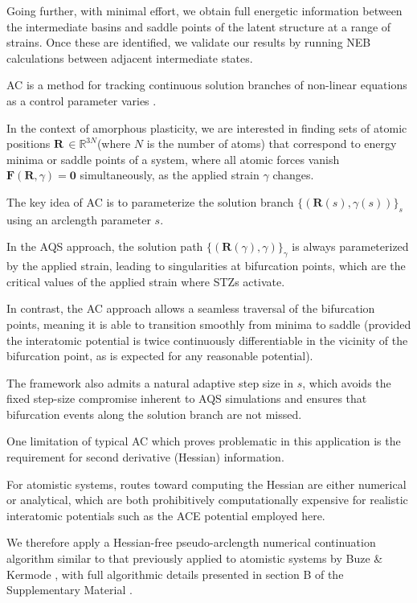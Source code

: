 \documentclass[aps,prl,reprint,superscriptaddress]{revtex4-2}
\begin{document}
Going further, with minimal effort, we obtain full energetic information between the intermediate basins and saddle points of the latent structure at a range of strains. Once these are identified, we validate our results by running NEB calculations between adjacent intermediate states.

AC is a method for tracking continuous solution branches of non-linear equations as a control parameter varies \cite{allgower2003introduction}.

In the context of amorphous plasticity, we are interested in finding sets of atomic positions $\mathbf{R}\, \in \mathbb{R}^{3N}$(where $N$ is the number of atoms) that correspond to energy minima or saddle points of a system, where all atomic forces vanish $\mathbf{F}(\mathbf{R},\gamma)=\mathbf{0}$ simultaneously, as the applied strain $\gamma$ changes.

The key idea of AC is to parameterize the solution branch $\{(\mathbf{R}(s), \gamma(s))\}_s$ using an arclength parameter $s$.

In the AQS approach, the solution path $\{(\mathbf{R}(\gamma),\gamma)\}_{\gamma}$ is always parameterized by the applied strain, leading to singularities at bifurcation points, which are the critical values of the applied strain where STZs activate.

In contrast, the AC approach allows a seamless traversal of the bifurcation points, meaning it is able to transition smoothly from minima to saddle (provided the interatomic potential is twice continuously differentiable in the vicinity of the bifurcation point, as is expected for any reasonable potential).

The framework also admits a natural adaptive step size in $s$, which avoids the fixed step-size compromise inherent to AQS simulations and ensures that bifurcation events along the solution branch are not missed.

One limitation of typical AC which proves problematic in this application is the requirement for second derivative (Hessian) information.

For atomistic systems, routes toward computing the Hessian are either numerical or analytical, which are both prohibitively computationally expensive for realistic interatomic potentials such as the ACE potential employed here.

We therefore apply a Hessian-free pseudo-arclength numerical continuation algorithm similar to that previously applied to atomistic systems by Buze \& Kermode \cite{buze2021numerical}, with full algorithmic details presented in section B of the Supplementary Material \cite{SupplementalB}.
\end{document}
